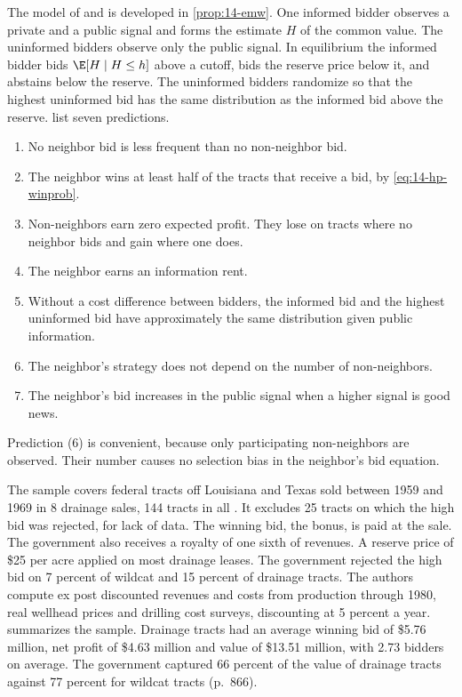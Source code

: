  The model of \citet{Wilson1967} and \citet{EngelbrechtWiggansMilgromWeber1983} is developed in
\cref{prop:14-emw}. One informed bidder observes a private and a public signal and forms the estimate $H$ of
the common value. The uninformed bidders observe only the public signal. In equilibrium the informed bidder bids
$\E[H\mid H\le h]$ above a cutoff, bids the reserve price below it, and abstains below the reserve. The
uninformed bidders randomize so that the highest uninformed bid has the same distribution as the informed bid
above the reserve. \citet[pp.~870--871]{HendricksPorter1988} list seven predictions.
\begin{enumerate}[label=(\arabic*)]
  \item No neighbor bid is less frequent than no non-neighbor bid.
  \item The neighbor wins at least half of the tracts that receive a bid, by \eqref{eq:14-hp-winprob}.
  \item Non-neighbors earn zero expected profit. They lose on tracts where no neighbor bids and gain where one
  does.
  \item The neighbor earns an information rent.
  \item Without a cost difference between bidders, the informed bid and the highest uninformed bid have
  approximately the same distribution given public information.
  \item The neighbor's strategy does not depend on the number of non-neighbors.
  \item The neighbor's bid increases in the public signal when a higher signal is good news.
\end{enumerate}
Prediction (6) is convenient, because only participating non-neighbors are observed. Their number causes no
selection bias in the neighbor's bid equation.

 The sample covers federal tracts off Louisiana and Texas sold between 1959 and 1969
in 8 drainage sales, 144 tracts in all \citep[p.~871]{HendricksPorter1988}. It excludes 25 tracts on which the
high bid was rejected, for lack of data. The winning bid, the bonus, is paid at the sale. The government also
receives a royalty of one sixth of revenues. A reserve price of \$25 per acre applied on most drainage leases.
The government rejected the high bid on 7 percent of wildcat and 15 percent of drainage tracts. The authors
compute ex post discounted revenues and costs from production through 1980, real wellhead prices and drilling cost
surveys, discounting at 5 percent a year.  summarizes the sample. Drainage tracts had an
average winning bid of \$5.76 million, net profit of \$4.63 million and value of \$13.51 million, with 2.73 bidders
on average. The government captured 66 percent of the value of drainage tracts against 77 percent for wildcat
tracts (p.~866).

